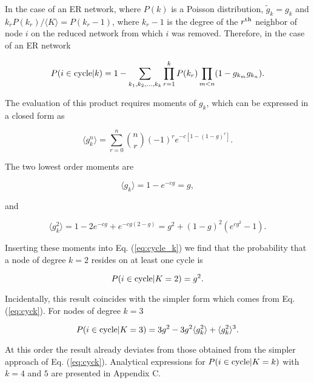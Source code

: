 \documentclass[preprint,pre,superscriptaddress,showpacs]{revtex4}
\begin{document}
\noindent
In the case of an ER network,
where $P(k)$ is a Poisson distribution,
$\tilde g_k = g_k$
and
$k_r P(k_r)/\langle K \rangle = P(k_r-1)$,
where $k_r-1$ is the degree of the $r^{\rm th}$ 
neighbor
of node $i$ on the reduced network from which $i$ 
was removed.
Therefore, in the case of an ER network

\begin{equation}
P(i \in {\rm cycle} |k) =
1 -
\sum_{k_1,k_2,\dots,k_k} \prod_{r=1}^k
P(k_r)
\prod_{m<n} ( 1 - g_{k_m} g_{k_n} ).
\label{eq:cycle_k}
\end{equation}

\noindent
The evaluation of this product requires moments of $g_k$,
which can be expressed in a closed form as

\begin{equation}
\langle g_k^n \rangle =
\sum_{r=0}^{n} \binom{n}{r}
(-1)^r e^{-c[1 - (1-g)^r]}.
\label{eq:g_k^n}
\end{equation}

\noindent
The two lowest order moments are

\begin{equation}
\langle g_k \rangle = 1 - e^{-cg} = g,
\label{eq:<g_k>}
\end{equation}

\noindent
and

\begin{equation}
\langle g_k^2 \rangle = 1 - 2 e^{-cg} + e^{-cg(2-g)} 
= g^2 +(1-g)^2(e^{cg^2}-1).
\label{eq:<g_k^2>}
\end{equation}

\noindent
Inserting these moments into Eq. (\ref{eq:cycle_k})
we find that
the probability that a node of degree $k=2$ resides
on at least one cycle is 

\begin{equation}
P(i \in {\rm cycle} | K=2) = g^2.
\label{eq:icyc2}
\end{equation}

\noindent
Incidentally, this result coincides with the simpler form which
comes from Eq. (\ref{eq:cyck}).
For nodes of degree $k=3$

\begin{equation}
P(i \in {\rm cycle} | K=3) =
3g^2 - 3 g^2 \langle g_k^2 \rangle 
+ \langle g_k^2 \rangle^3.
\label{eq:icyc3}
\end{equation}

\noindent
At this order the result already deviates from those obtained
from the simpler approach of Eq. (\ref{eq:cyck}).
Analytical expressions for 
$P(i \in {\rm cycle} |K= k)$
with $k=4$ and $5$ are presented in Appendix C.
\end{document}
